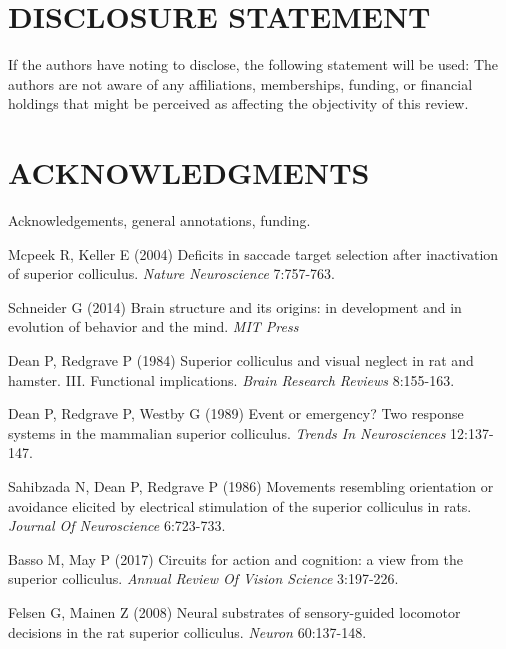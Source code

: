 \documentclass{ar-1col}
\begin{document}
{%
\section*{DISCLOSURE STATEMENT}
If the authors have noting to disclose, the following statement will be used: The authors are not aware of any affiliations, memberships, funding, or financial holdings that
might be perceived as affecting the objectivity of this review. 

\section*{ACKNOWLEDGMENTS}
Acknowledgements, general annotations, funding.

%


% 
\begin{thebibliography}{00}

Mcpeek R, Keller E (2004) 
Deficits in saccade target selection after inactivation of superior colliculus.
\textit{ Nature Neuroscience} 7:757-763.

Schneider G (2014) 
Brain structure and its origins: in development and in evolution of behavior and the mind.
\textit{ MIT Press}

Dean P, Redgrave P (1984) 
Superior colliculus and visual neglect in rat and hamster. III. Functional implications.
\textit{ Brain Research Reviews} 8:155-163.

Dean P, Redgrave P, Westby G (1989) 
Event or emergency? Two response systems in the mammalian superior colliculus.
\textit{ Trends In Neurosciences} 12:137-147.

Sahibzada N, Dean P, Redgrave P (1986) 
Movements resembling orientation or avoidance elicited by electrical stimulation of the superior colliculus in rats.
\textit{ Journal Of Neuroscience} 6:723-733.

Basso M, May P (2017) 
Circuits for action and cognition: a view from the superior colliculus.
\textit{ Annual Review Of Vision Science} 3:197-226.

Felsen G, Mainen Z (2008) 
Neural substrates of sensory-guided locomotor decisions in the rat superior colliculus.
\textit{ Neuron} 60:137-148.


\end{thebibliography}}
\end{document}
